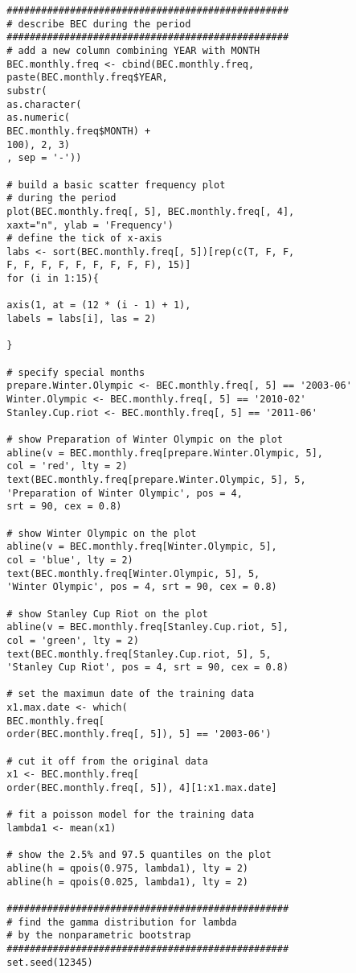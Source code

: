 \begin{enumerate}
\begin{verbatim}
		#################################################
		# describe BEC during the period
		#################################################
		# add a new column combining YEAR with MONTH
		BEC.monthly.freq <- cbind(BEC.monthly.freq, 
		paste(BEC.monthly.freq$YEAR, 
		substr(
		as.character(
		as.numeric(
		BEC.monthly.freq$MONTH) + 
		100), 2, 3)
		, sep = '-'))
		
		# build a basic scatter frequency plot 
		# during the period
		plot(BEC.monthly.freq[, 5], BEC.monthly.freq[, 4], 
		xaxt="n", ylab = 'Frequency')
		# define the tick of x-axis
		labs <- sort(BEC.monthly.freq[, 5])[rep(c(T, F, F, 
		F, F, F, F, F, F, F, F, F), 15)]
		for (i in 1:15){
		
		axis(1, at = (12 * (i - 1) + 1), 
		labels = labs[i], las = 2)
		
		}
		
		# specify special months
		prepare.Winter.Olympic <- BEC.monthly.freq[, 5] == '2003-06'
		Winter.Olympic <- BEC.monthly.freq[, 5] == '2010-02'
		Stanley.Cup.riot <- BEC.monthly.freq[, 5] == '2011-06'
		
		# show Preparation of Winter Olympic on the plot
		abline(v = BEC.monthly.freq[prepare.Winter.Olympic, 5], 
		col = 'red', lty = 2)
		text(BEC.monthly.freq[prepare.Winter.Olympic, 5], 5, 
		'Preparation of Winter Olympic', pos = 4, 
		srt = 90, cex = 0.8)
		
		# show Winter Olympic on the plot 
		abline(v = BEC.monthly.freq[Winter.Olympic, 5], 
		col = 'blue', lty = 2)
		text(BEC.monthly.freq[Winter.Olympic, 5], 5, 
		'Winter Olympic', pos = 4, srt = 90, cex = 0.8)
		
		# show Stanley Cup Riot on the plot 
		abline(v = BEC.monthly.freq[Stanley.Cup.riot, 5], 
		col = 'green', lty = 2)
		text(BEC.monthly.freq[Stanley.Cup.riot, 5], 5, 
		'Stanley Cup Riot', pos = 4, srt = 90, cex = 0.8)
		
		# set the maximun date of the training data
		x1.max.date <- which(
		BEC.monthly.freq[
		order(BEC.monthly.freq[, 5]), 5] == '2003-06')
		
		# cut it off from the original data
		x1 <- BEC.monthly.freq[
		order(BEC.monthly.freq[, 5]), 4][1:x1.max.date]
		
		# fit a poisson model for the training data
		lambda1 <- mean(x1)
		
		# show the 2.5% and 97.5 quantiles on the plot
		abline(h = qpois(0.975, lambda1), lty = 2)
		abline(h = qpois(0.025, lambda1), lty = 2)
		
		#################################################
		# find the gamma distribution for lambda 
		# by the nonparametric bootstrap
		#################################################
		set.seed(12345)
		

\end{verbatim}
\end{enumerate}
